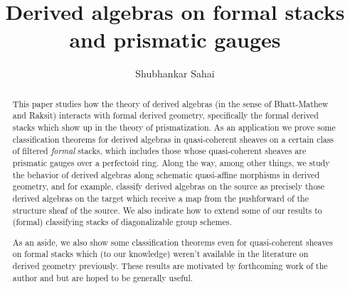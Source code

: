 \documentclass[10pt,reqno]{amsart}
\numberwithin{equation}{section}
\begin{document}
\newtheorem{theorem}{Theorem}[section]
\newtheorem*{theorem*}{Theorem}
\newtheorem*{condition*}{Condition}
\newtheorem*{definition*}{Definition}
\newtheorem{proposition}[theorem]{Proposition}
\newtheorem{lemma}[theorem]{Lemma}
\newtheorem{corollary}[theorem]{Corollary}
\newtheorem{claim}[theorem]{Claim}

\theoremstyle{definition}
\newtheorem{definition}[theorem]{Definition}
\newtheorem{question}[theorem]{Question}
\newtheorem{goal}[theorem]{Goal}
\newtheorem{remark}[theorem]{Remark}
\newtheorem{guess}[theorem]{Guess}
\newtheorem{example}[theorem]{Example}
\newtheorem{condition}[theorem]{Condition}
\newtheorem{warning}[theorem]{Warning}
\newtheorem{caution}[theorem]{Caution}
\newtheorem{notation}[theorem]{Notation}
\newtheorem{construction}[theorem]{Construction}
\newtheorem{recollection}[theorem]{Recollection}
\newtheorem{variant}[theorem]{Variant}





\title{Derived algebras on formal stacks and prismatic gauges}
\begin{abstract}
This paper studies how the theory of derived algebras (in the sense of Bhatt-Mathew and Raksit) interacts with formal derived geometry, specifically the formal derived stacks which show up in the theory of prismatization. As an application we prove some classification theorems for derived algebras in quasi-coherent sheaves on a certain class of filtered \emph{formal} stacks, which includes those whose quasi-coherent sheaves are prismatic gauges over a perfectoid ring. Along the way, among other things, we study the behavior of derived algebras along schematic quasi-affine morphisms in derived geometry, and for example, classify derived algebras on the source as precisely those derived algebras on the target which receive a map from the pushforward of the structure sheaf of the source. We also indicate how to extend some of our results to (formal) classifying stacks of diagonalizable group schemes.

As an aside, we also show some classification theorems even for quasi-coherent sheaves on formal stacks which (to our knowledge) weren't available in the literature on derived geometry previously.
These results are motivated by forthcoming work of the author \cite{Sah25Nyg} and \cite{Sah25Syn} but are hoped to be generally useful.
\end{abstract}
\author{Shubhankar Sahai}
\address{Department of Mathematics, University of California San Diego, La Jolla, CA 92093, USA}
\maketitle
\tableofcontents
\end{document}
